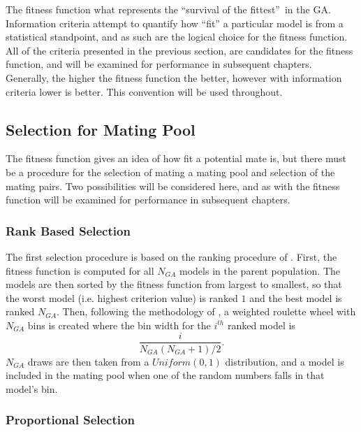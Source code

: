 The fitness function what represents the ``survival of the fittest\textquotedblright{}\ in
the GA. Information criteria attempt to quantify how ``fit\textquotedblright{}
a particular model is from a statistical standpoint, and as such are
the logical choice for the fitness function. All of the criteria presented
in the previous section, are candidates for the fitness function,
and will be examined for performance in subsequent chapters. Generally,
the higher the fitness function the better, however with information
criteria lower is better. This convention will be used throughout.


\subsection{Selection for Mating Pool}

The fitness function gives an idea of how fit a potential mate is,
but there must be a procedure for the selection of mating a mating
pool and selection of the mating pairs. Two possibilities will be
considered here, and as with the fitness function will be examined
for performance in subsequent chapters.


\subsubsection{Rank Based Selection}

The first selection procedure is based on the ranking procedure of
\citet{Baker:1985}. First, the fitness function is computed for all
$N_{GA}$ models in the parent population. The models are then sorted
by the fitness function from largest to smallest, so that the worst
model (i.e. highest criterion value) is ranked $1$ and the best model
is ranked $N_{GA}$. Then, following the methodology of \citet{Bea:Boz:1998,Bea:Boz:2000},
a \textquotedbl{}weighted roulette wheel\textquotedbl{} with $N_{GA}$
bins is created where the bin width for the $i^{th}$ ranked model
is
\begin{equation}
\frac{i}{N_{GA}\left(N_{GA}+1\right)/2}.
\end{equation}
$N_{GA}$ draws are then taken from a $Uniform\left(0,1\right)$ distribution,
and a model is included in the mating pool when one of the random
numbers falls in that model's bin.


\subsubsection{Proportional Selection}


